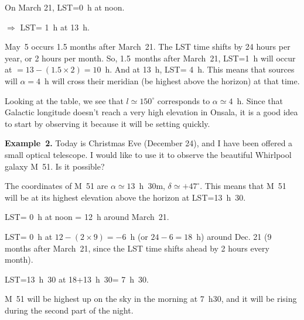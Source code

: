 \smallskip
On March 21, LST=0~h at noon. 

$\Rightarrow$ LST= 1~h at 13~h. 

May~5 occurs 1.5 months after March~21. The LST time shifts by
24 hours per year, or 2 hours per month. So, 1.5~months after
March~21, LST=1~h will occur at $=13 -(1.5\times 2) = 10$~h. 
And at 13~h, LST= 4~h. This means that sources will $\alpha=4$~h
will cross their meridian (be highest above the horizon) 
at that time.  

Looking at the table, we see that $l\simeq 150^\circ$ corresponds to $\alpha\simeq 4$~h. 
Since that Galactic longitude doesn't reach a very high elevation in Onsala, it is a 
good idea to start by observing it because it will be setting quickly. 

\bigskip
{\bf Example~2.} Today is Christmas Eve (December 24), and I have been offered a small optical
telescope. I would like to use it to observe the beautiful Whirlpool galaxy M~51. 
Is it possible? 

\smallskip
The coordinates of M~51 are $\alpha\simeq13$~h~30m, $\delta\simeq+47^\circ$. 
This means that M~51 will be at its highest elevation above the horizon at
LST=13~h~30. 

LST= 0~h at noon = 12~h around March~21. 

LST= 0~h at $12-(2\times 9) = -6$~h (or $24-6=18$~h) around Dec. 21 (9 months after March~21, 
since the LST time shifts ahead by 2 hours every month). 

LST=13~h~30 at 18+13~h~30= 7~h~30.  

M~51 will be highest up on the sky in the morning at 7~h30, and it will be rising during the
second part of the night. 




